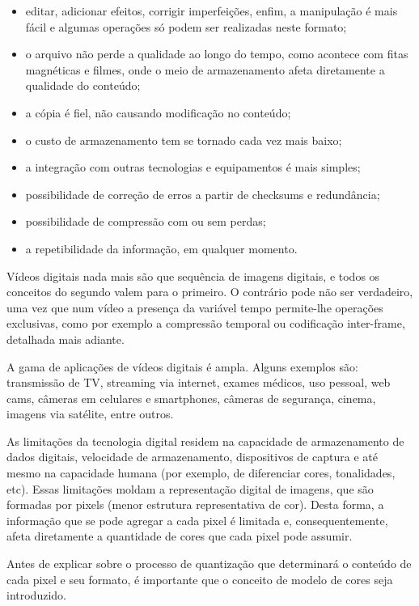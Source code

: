 \begin{itemize}
	\item editar, adicionar efeitos, corrigir imperfeições, enfim, a manipulação é mais fácil e algumas operações só podem ser realizadas neste formato;
	\item o arquivo não perde a qualidade ao longo do tempo, como acontece com fitas magnéticas e filmes, onde o meio de armazenamento afeta diretamente a qualidade do conteúdo;
	\item a cópia é fiel, não causando modificação no conteúdo;
	\item o custo de armazenamento tem se tornado cada vez mais baixo;
	\item a integração com outras tecnologias e equipamentos é mais simples;
	\item possibilidade de correção de erros a partir de checksums e redundância;
	\item possibilidade de compressão com ou sem perdas;
	\item a repetibilidade da informação, em qualquer momento.
\end{itemize}

Vídeos digitais nada mais são que sequência de imagens digitais, e todos os conceitos do segundo valem para o primeiro. O contrário pode não ser verdadeiro, uma vez que num vídeo a presença da variável tempo permite-lhe operações exclusivas, como por exemplo a compressão temporal ou codificação inter-frame, detalhada mais adiante.

A gama de aplicações de vídeos digitais é ampla. Alguns exemplos são: transmissão de TV, streaming via internet, exames médicos, uso pessoal, web cams, câmeras em celulares e smartphones, câmeras de segurança, cinema, imagens via satélite, entre outros.

As limitações da tecnologia digital residem na capacidade de armazenamento de dados digitais, velocidade de armazenamento, dispositivos de captura e até mesmo na capacidade humana (por exemplo, de diferenciar cores, tonalidades, etc). Essas limitações moldam a representação digital de imagens, que são formadas por pixels (menor estrutura representativa de cor). Desta forma, a informação que se pode agregar a cada pixel é limitada e, consequentemente, afeta diretamente a quantidade de cores que cada pixel pode assumir.

Antes de explicar sobre o processo de quantização que determinará o conteúdo de cada pixel e seu formato, é importante que o conceito de modelo de cores seja introduzido.

